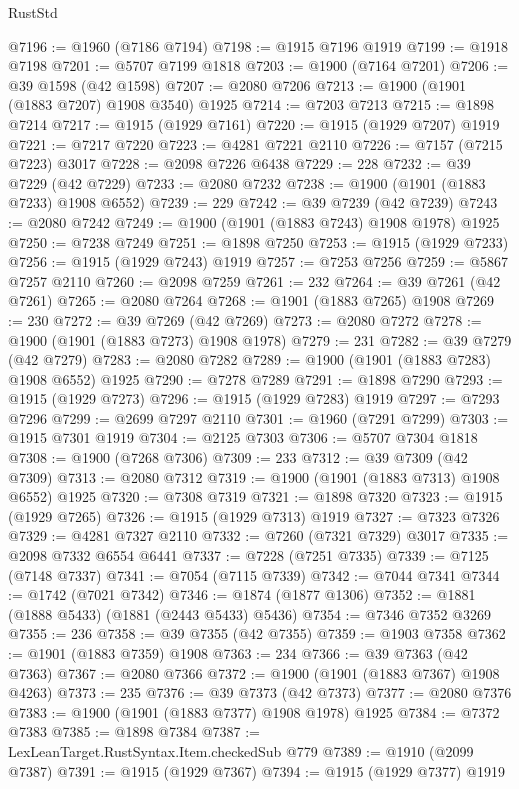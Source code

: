 \begin{lexlean}{RustStd}
\begin{coremodule}
@7196 := @1960 (@7186 @7194)
@7198 := @1915 @7196 @1919
@7199 := @1918 @7198
@7201 := @5707 @7199 @1818
@7203 := @1900 (@7164 @7201)
@7206 := @39 @1598 (@42 @1598)
@7207 := @2080 @7206
@7213 := @1900 (@1901 (@1883 @7207) @1908 @3540) @1925
@7214 := @7203 @7213
@7215 := @1898 @7214
@7217 := @1915 (@1929 @7161)
@7220 := @1915 (@1929 @7207) @1919
@7221 := @7217 @7220
@7223 := @4281 @7221 @2110
@7226 := @7157 (@7215 @7223) @3017
@7228 := @2098 @7226 @6438
@7229 := 228
@7232 := @39 @7229 (@42 @7229)
@7233 := @2080 @7232
@7238 := @1900 (@1901 (@1883 @7233) @1908 @6552)
@7239 := 229
@7242 := @39 @7239 (@42 @7239)
@7243 := @2080 @7242
@7249 := @1900 (@1901 (@1883 @7243) @1908 @1978) @1925
@7250 := @7238 @7249
@7251 := @1898 @7250
@7253 := @1915 (@1929 @7233)
@7256 := @1915 (@1929 @7243) @1919
@7257 := @7253 @7256
@7259 := @5867 @7257 @2110
@7260 := @2098 @7259
@7261 := 232
@7264 := @39 @7261 (@42 @7261)
@7265 := @2080 @7264
@7268 := @1901 (@1883 @7265) @1908
@7269 := 230
@7272 := @39 @7269 (@42 @7269)
@7273 := @2080 @7272
@7278 := @1900 (@1901 (@1883 @7273) @1908 @1978)
@7279 := 231
@7282 := @39 @7279 (@42 @7279)
@7283 := @2080 @7282
@7289 := @1900 (@1901 (@1883 @7283) @1908 @6552) @1925
@7290 := @7278 @7289
@7291 := @1898 @7290
@7293 := @1915 (@1929 @7273)
@7296 := @1915 (@1929 @7283) @1919
@7297 := @7293 @7296
@7299 := @2699 @7297 @2110
@7301 := @1960 (@7291 @7299)
@7303 := @1915 @7301 @1919
@7304 := @2125 @7303
@7306 := @5707 @7304 @1818
@7308 := @1900 (@7268 @7306)
@7309 := 233
@7312 := @39 @7309 (@42 @7309)
@7313 := @2080 @7312
@7319 := @1900 (@1901 (@1883 @7313) @1908 @6552) @1925
@7320 := @7308 @7319
@7321 := @1898 @7320
@7323 := @1915 (@1929 @7265)
@7326 := @1915 (@1929 @7313) @1919
@7327 := @7323 @7326
@7329 := @4281 @7327 @2110
@7332 := @7260 (@7321 @7329) @3017
@7335 := @2098 @7332 @6554 @6441
@7337 := @7228 (@7251 @7335)
@7339 := @7125 (@7148 @7337)
@7341 := @7054 (@7115 @7339)
@7342 := @7044 @7341
@7344 := @1742 (@7021 @7342)
@7346 := @1874 (@1877 @1306)
@7352 := @1881 (@1888 @5433) (@1881 (@2443 @5433) @5436)
@7354 := @7346 @7352 @3269
@7355 := 236
@7358 := @39 @7355 (@42 @7355)
@7359 := @1903 @7358
@7362 := @1901 (@1883 @7359) @1908
@7363 := 234
@7366 := @39 @7363 (@42 @7363)
@7367 := @2080 @7366
@7372 := @1900 (@1901 (@1883 @7367) @1908 @4263)
@7373 := 235
@7376 := @39 @7373 (@42 @7373)
@7377 := @2080 @7376
@7383 := @1900 (@1901 (@1883 @7377) @1908 @1978) @1925
@7384 := @7372 @7383
@7385 := @1898 @7384
@7387 := LexLeanTarget.RustSyntax.Item.checkedSub @779
@7389 := @1910 (@2099 @7387)
@7391 := @1915 (@1929 @7367)
@7394 := @1915 (@1929 @7377) @1919

\end{coremodule}
\end{lexlean}
